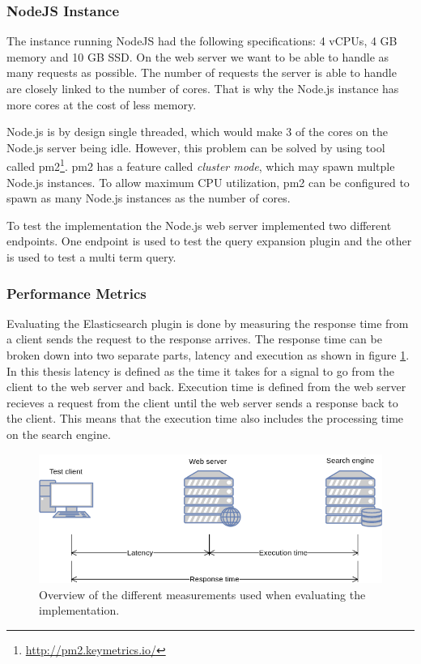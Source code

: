 \subsubsection{NodeJS Instance}
The instance running NodeJS had the following specifications: 4 vCPUs, 4 GB memory and 10 GB SSD.
On the web server we want to be able to handle as many requests as possible.
The number of requests the server is able to handle are closely linked to the number of cores.
That is why the Node.js instance has more cores at the cost of less memory.

Node.js is by design single threaded, which would make 3 of the cores on the Node.js server being idle.
However, this problem can be solved by using tool called pm2\footnote{\url{http://pm2.keymetrics.io/}}.
pm2 has a feature called \textit{cluster mode}, which may spawn multple Node.js instances.
To allow maximum CPU utilization, pm2 can be configured to spawn as many Node.js instances as the number of cores.

To test the implementation the Node.js web server implemented two different endpoints.
One endpoint is used to test the query expansion plugin and the other is used to test a multi term query.

\subsubsection{Performance Metrics}
Evaluating the Elasticsearch plugin is done by measuring the response time from a client sends the request to the response arrives.
The response time can be broken down into two separate parts, latency and execution as shown in figure \ref{fig:latency-measurements}.
In this thesis latency is defined as the time it takes for a signal to go from the client to the web server and back.
Execution time is defined from the web server recieves a request from the client until the web server sends a response back to the client.
This means that the execution time also includes the processing time on the search engine.


\begin{figure}[h!]
  \centering \includegraphics[width=0.9\linewidth]{img/latency-measurements.png}
  \caption{Overview of the different measurements used when evaluating the implementation.}
  \label{fig:latency-measurements}
\end{figure}
